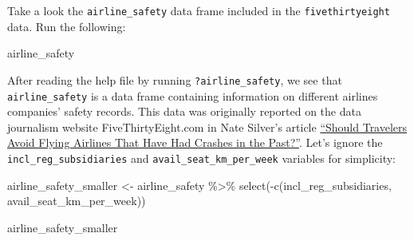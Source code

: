 \documentclass[
  letterpaper,
  DIV=11,
  numbers=noendperiod]{scrreprt}
\newenvironment{Shaded}{\begin{snugshade}}{\end{snugshade}}
\newcommand{\FunctionTok}[1]{\textcolor[rgb]{0.28,0.35,0.67}{#1}}
\newcommand{\NormalTok}[1]{\textcolor[rgb]{0.00,0.23,0.31}{#1}}
\newcommand{\OtherTok}[1]{\textcolor[rgb]{0.00,0.23,0.31}{#1}}
\newcommand{\SpecialCharTok}[1]{\textcolor[rgb]{0.37,0.37,0.37}{#1}}
\theoremstyle{definition}
\theoremstyle{remark}
\begin{document}
\begin{tcolorbox}[enhanced jigsaw, colback=white, toprule=.15mm, bottomrule=.15mm, titlerule=0mm, title={{🎯} Learning Check 4.3}, leftrule=.75mm, arc=.35mm, left=2mm, colframe=quarto-callout-tip-color-frame, coltitle=black, opacitybacktitle=0.6, bottomtitle=1mm, colbacktitle=quarto-callout-tip-color!10!white, opacityback=0, toptitle=1mm, rightrule=.15mm, breakable]

Take a look the \texttt{airline\_safety} data frame included in the
\texttt{fivethirtyeight} data. Run the following:

\begin{Shaded}
\begin{Highlighting}[]
\NormalTok{airline\_safety}
\end{Highlighting}
\end{Shaded}

After reading the help file by running \texttt{?airline\_safety}, we see
that \texttt{airline\_safety} is a data frame containing information on
different airlines companies' safety records. This data was originally
reported on the data journalism website FiveThirtyEight.com in Nate
Silver's article
\href{https://fivethirtyeight.com/features/should-travelers-avoid-flying-airlines-that-have-had-crashes-in-the-past/}{``Should
Travelers Avoid Flying Airlines That Have Had Crashes in the Past?''}.
Let's ignore the \texttt{incl\_reg\_subsidiaries} and
\texttt{avail\_seat\_km\_per\_week} variables for simplicity:

\begin{Shaded}
\begin{Highlighting}[]
\NormalTok{airline\_safety\_smaller }\OtherTok{\textless{}{-}}\NormalTok{ airline\_safety }\SpecialCharTok{\%\textgreater{}\%} 
  \FunctionTok{select}\NormalTok{(}\SpecialCharTok{{-}}\FunctionTok{c}\NormalTok{(incl\_reg\_subsidiaries, avail\_seat\_km\_per\_week))}

\NormalTok{airline\_safety\_smaller}
\end{Highlighting}
\end{Shaded}


\end{tcolorbox}
\end{document}

